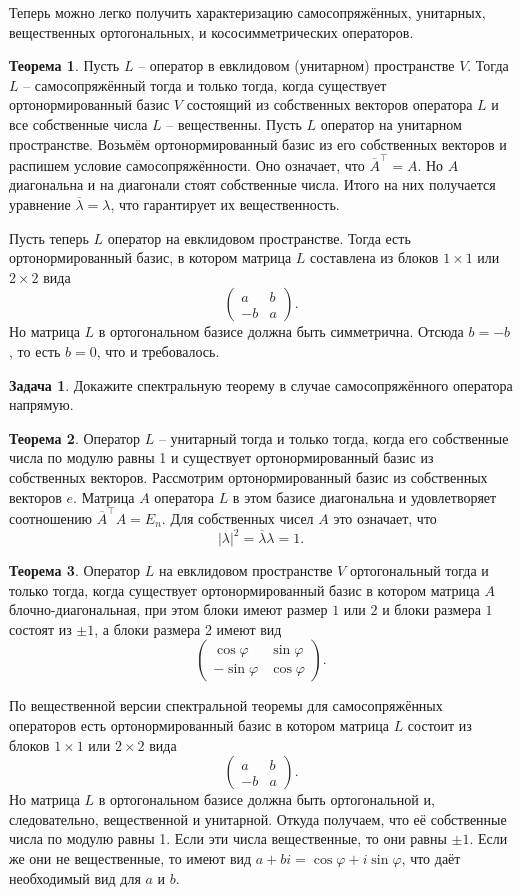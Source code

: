 \documentclass[10pt,a4paper,oneside]{book} %
\theoremstyle{definition}
\newtheorem{zad}{Задача}
\newtheorem{thm}{Теорема}
\newcommand{\ovl}{\overline}
\def\ffi{\varphi}
\def\thrm{\begin{thm}}
\def\ethrm{\end{thm}}
\def\zd{\begin{zad}}
\def\ezd{\end{zad}}
\def\pmat{\begin{pmatrix}}
\def\epmat{\end{pmatrix}}
\begin{document}
Теперь можно легко получить характеризацию самосопряжённых, унитарных, вещественных ортогональных, и кососимметрических операторов.

\thrm Пусть $L$ -- оператор в евклидовом (унитарном) пространстве $V$. Тогда $L$ -- самосопряжённый тогда и только тогда, когда существует ортонормированный базис $V$ состоящий из собственных векторов оператора $L$ и все собственные числа $L$ -- вещественны.
\proof Пусть $L$ оператор на унитарном пространстве. Возьмём ортонормированный базис из его собственных векторов и распишем условие самосопряжённости. Оно означает, что $\ovl{A}^{\top}=A$. Но $A$ диагональна и на диагонали стоят собственные числа. Итого на них получается уравнение $\ovl{\lambda}=\lambda$, что гарантирует их вещественность.

Пусть теперь  $L$ оператор на евклидовом пространстве. Тогда есть ортонормированный базис, в котором матрица $L$ составлена из блоков $1\times 1$ или $2\times 2$ вида 
$$\pmat a& b \\ -b & a \epmat.$$
Но матрица $L$ в ортогональном базисе должна быть симметрична. Отсюда $b=-b$, то есть $b=0$, что и требовалось.
\endproof
\ethrm



\zd Докажите спектральную теорему в случае самосопряжённого оператора напрямую.
\ezd

\thrm Оператор $L$ -- унитарный тогда и только тогда, когда его собственные числа по модулю равны 1 и существует ортонормированный базис из собственных векторов. 
\proof Рассмотрим ортонормированный базис из собственных векторов $e$. Матрица $A$ оператора $L$ в этом базисе диагональна и удовлетворяет соотношению $\ovl{A}^{\top}A=E_n$. Для собственных чисел $A$ это означает, что $$|\lambda|^2=\ovl{\lambda}\lambda=1.$$ 
\endproof
\ethrm






\thrm Оператор $L$ на евклидовом пространстве $V$ ортогональный  тогда и только тогда, когда существует ортонормированный базис в котором матрица $A$ блочно-диагональная, при этом блоки имеют размер $1$ или $2$ и блоки размера $1$ состоят из $\pm 1$, а блоки размера 2 имеют вид
$$\begin{pmatrix}
\cos \varphi & \sin \varphi\\

-\sin \varphi &\cos \varphi
\end{pmatrix}.$$
\ethrm
\proof
По вещественной версии спектральной теоремы для самосопряжённых операторов есть ортонормированный базис в котором матрица $L$ состоит из блоков $1\times 1$ или $2\times 2$ вида 
$$\pmat a& b \\ -b & a \epmat.$$
Но матрица $L$ в ортогональном базисе должна быть ортогональной и, следовательно, вещественной и унитарной. Откуда получаем, что её собственные числа по модулю равны 1. Если эти числа вещественные, то они равны $\pm 1$. Если же они не вещественные, то имеют вид $a+bi=\cos \ffi + i \sin \ffi$, что даёт необходимый вид для $a$ и $b$.
\end{document}
